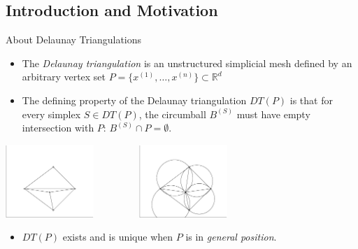 \documentclass[aspectratio=169]{beamer}
\newcommand{\cmark}{\ding{51}}
\newcommand{\xmark}{\ding{55}}
\begin{document}
\subsection{Introduction and Motivation}
\begin{frame}{About Delaunay Triangulations}
\begin{itemize}
\item The {\it Delaunay triangulation} is an unstructured simplicial mesh
defined by an arbitrary vertex set
$P = \{x^{(1)}, \ldots, x^{(n)}\} \subset \mathbb{R}^d$
\item The defining property of the Delaunay triangulation $DT(P)$ is that
for every simplex $S \in DT(P)$, the circumball $B^{(S)}$
must have empty intersection with $P$:
$B^{(S)} \cap P = \emptyset$.
\end{itemize}
\begin{center}
\includegraphics[width=0.25\textwidth]{triangleplane.eps}
\hskip 4pt{\color{red} \xmark}
$\qquad\qquad$
\includegraphics[width=0.25\textwidth]{delaunayplane.eps}
\hskip 4pt{\color{green} \cmark}
\end{center}
\begin{itemize}
\item $DT(P)$ exists and is unique when $P$ is in {\it general position}.
\end{itemize}
\end{frame}
\end{document}
